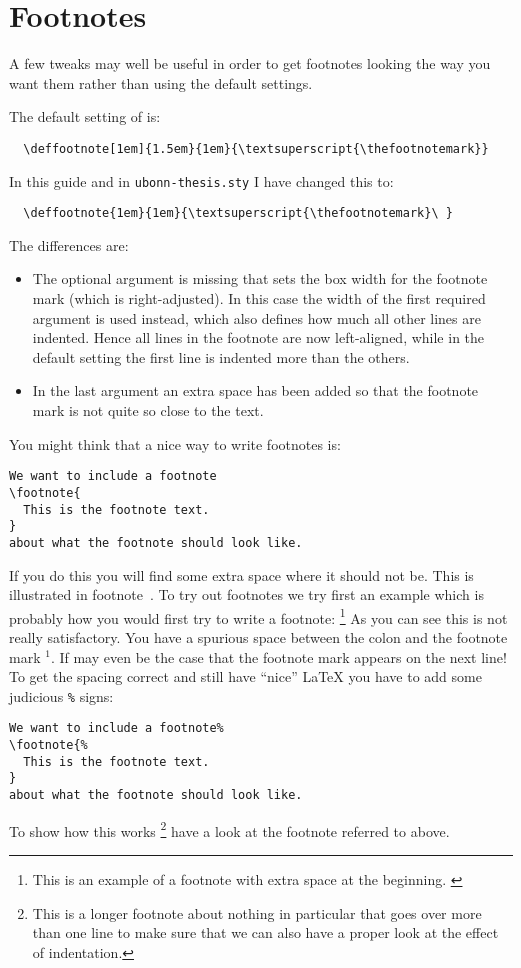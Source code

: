 \section{Footnotes}
\label{sec:layout:footnote}

A few tweaks may well be useful in order to get footnotes looking the
way you want them rather than using the default \KOMAScript{}
settings.

The default setting of \KOMAScript{} is:
\begin{verbatim}
  \deffootnote[1em]{1.5em}{1em}{\textsuperscript{\thefootnotemark}}
\end{verbatim}
In this guide and in \texttt{ubonn-thesis.sty} I have changed this to:
\begin{verbatim}
  \deffootnote{1em}{1em}{\textsuperscript{\thefootnotemark}\ }
\end{verbatim}
The differences are:
\begin{itemize}
\item The optional argument is missing that sets the box width for the
  footnote mark (which is right-adjusted). In this case the width of
  the first required argument is used instead, which also defines how
  much all other lines are indented. Hence all lines in the footnote
  are now left-aligned, while in the default setting the first line is
  indented more than the others.
\item In the last argument an extra space has been added so that the
  footnote mark is not quite so close to the text.
\end{itemize}

You might think that a nice way to write footnotes is:
\begin{verbatim}
We want to include a footnote
\footnote{
  This is the footnote text.
}
about what the footnote should look like.
\end{verbatim}
If you do this you will find some extra space where it should not be.
This is illustrated in footnote~.
To try out footnotes we try first an example which is probably how you
would first try to write a footnote:
\footnote{
  This is an example of a footnote with extra space at the beginning.
  \label{foot:short}
}
As you can see this is not really satisfactory. You have a spurious
space between the colon and the footnote mark $^{1}$. If may even
be the case that the footnote mark appears on the next line! To get the spacing
correct and still have \enquote{nice} \LaTeX{} you have to add some
judicious \texttt{\%} signs:
\begin{verbatim}
We want to include a footnote%
\footnote{%
  This is the footnote text.
}
about what the footnote should look like.
\end{verbatim}
To show how this works%
\footnote{\label{foot:long}%
  This is a longer footnote about nothing in particular that goes
  over more than one line to make sure that we can also have a proper
  look at the effect of indentation.}
have a look at the footnote referred to above.

